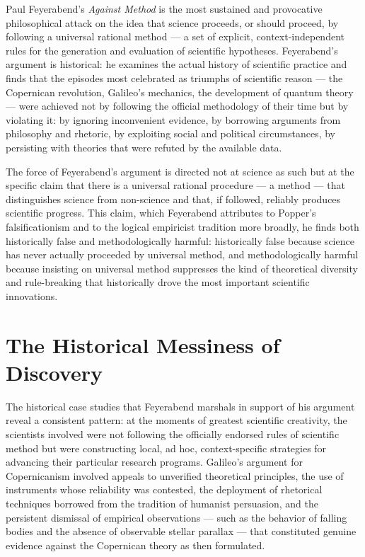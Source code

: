 \documentclass[12pt,openany]{book}
\theoremstyle{plain}
\theoremstyle{definition}
\theoremstyle{remark}
\begin{document}
Paul Feyerabend's \emph{Against Method} is the most sustained and provocative philosophical attack on the idea that science proceeds, or should proceed, by following a universal rational method — a set of explicit, context-independent rules for the generation and evaluation of scientific hypotheses. Feyerabend's argument is historical: he examines the actual history of scientific practice and finds that the episodes most celebrated as triumphs of scientific reason — the Copernican revolution, Galileo's mechanics, the development of quantum theory — were achieved not by following the official methodology of their time but by violating it: by ignoring inconvenient evidence, by borrowing arguments from philosophy and rhetoric, by exploiting social and political circumstances, by persisting with theories that were refuted by the available data.

The force of Feyerabend's argument is directed not at science as such but at the specific claim that there is a universal rational procedure — a method — that distinguishes science from non-science and that, if followed, reliably produces scientific progress. This claim, which Feyerabend attributes to Popper's falsificationism and to the logical empiricist tradition more broadly, he finds both historically false and methodologically harmful: historically false because science has never actually proceeded by universal method, and methodologically harmful because insisting on universal method suppresses the kind of theoretical diversity and rule-breaking that historically drove the most important scientific innovations.

\section{The Historical Messiness of Discovery}

The historical case studies that Feyerabend marshals in support of his argument reveal a consistent pattern: at the moments of greatest scientific creativity, the scientists involved were not following the officially endorsed rules of scientific method but were constructing local, ad hoc, context-specific strategies for advancing their particular research programs. Galileo's argument for Copernicanism involved appeals to unverified theoretical principles, the use of instruments whose reliability was contested, the deployment of rhetorical techniques borrowed from the tradition of humanist persuasion, and the persistent dismissal of empirical observations — such as the behavior of falling bodies and the absence of observable stellar parallax — that constituted genuine evidence against the Copernican theory as then formulated.
\end{document}

